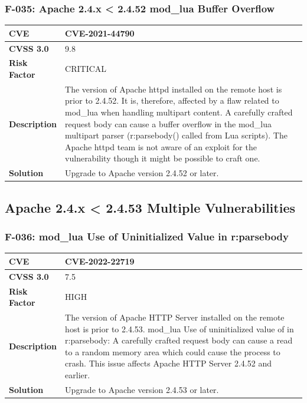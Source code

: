 \subsubsection{F-035: Apache 2.4.x < 2.4.52 mod\_lua Buffer Overflow}
\begin{tabular}{|p{2.8cm}|p{12.2cm}|}
\hline
\textbf{CVE} & CVE-2021-44790 \\ \hline
\textbf{CVSS 3.0} & 9.8 \\ \hline
\textbf{Risk Factor} & CRITICAL \\ \hline
\textbf{Description} & The version of Apache httpd installed on the remote host is prior to 2.4.52. It is, therefore, affected by a flaw related to mod\_lua when handling multipart content. A carefully crafted request body can cause a buffer overflow in the mod\_lua multipart parser (r:parsebody() called from Lua scripts). The Apache httpd team is not aware of an exploit for the vulnerability though it might be possible to craft one. \\ \hline
\textbf{Solution} & Upgrade to Apache version 2.4.52 or later. \\ \hline
\end{tabular}

%
%
\subsection{Apache 2.4.x < 2.4.53 Multiple Vulnerabilities}

\subsubsection{F-036: mod\_lua Use of Uninitialized Value in r:parsebody}
\begin{tabular}{|p{2.8cm}|p{12.2cm}|}
\hline
\textbf{CVE} & CVE-2022-22719 \\ \hline
\textbf{CVSS 3.0} & 7.5 \\ \hline
\textbf{Risk Factor} & HIGH \\ \hline
\textbf{Description} & The version of Apache HTTP Server installed on the remote host is prior to 2.4.53. mod\_lua Use of uninitialized value of in r:parsebody: A carefully crafted request body can cause a read to a random memory area which could cause the process to crash. This issue affects Apache HTTP Server 2.4.52 and earlier. \\ \hline
\textbf{Solution} & Upgrade to Apache version 2.4.53 or later. \\ \hline
\end{tabular}

